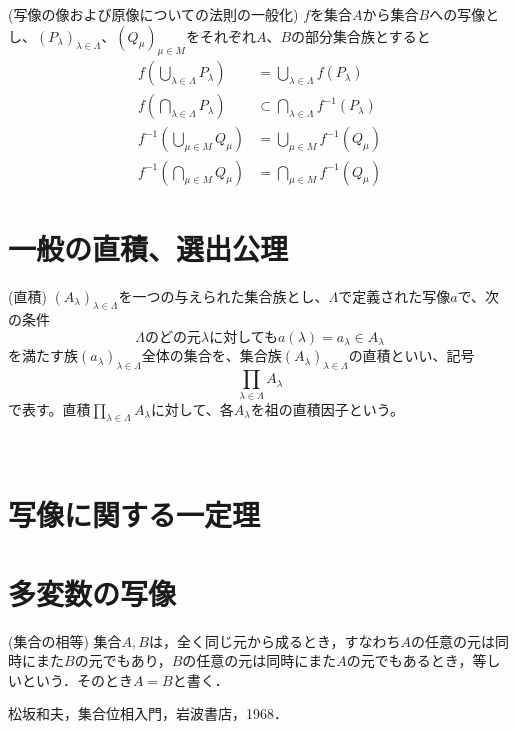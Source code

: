 \documentclass[a4j]{jsarticle}
\begin{document}
\begin{itembox}[l]{ (写像の像および原像についての法則の一般化)}
	$f$を集合$A$から集合$B$への写像とし、$(P_\lambda)_{\lambda \in \Lambda}$、$(Q_\mu)_{\mu \in M}$をそれぞれ$A$、$B$の部分集合族とすると
	\begin{align}
		f \left( \bigcup_{\lambda \in \Lambda}P_\lambda \right) & = \bigcup_{\lambda \in \Lambda}f(P_\lambda)            \\
		f \left( \bigcap_{\lambda \in \Lambda}P_\lambda \right) & \subset \bigcap_{\lambda \in \Lambda}f^{-1}(P_\lambda) \\
		f^{-1} \left( \bigcup_{\mu \in M}Q_\mu \right)          & = \bigcup_{\mu \in M}f^{-1}(Q_\mu)                     \\
		f^{-1} \left( \bigcap_{\mu \in M}Q_\mu \right)          & = \bigcap_{\mu \in M}f^{-1}(Q_\mu)
	\end{align}
\end{itembox}

\section{一般の直積、選出公理}

\begin{itembox}[l]{ (直積)}
	$(A_\lambda)_{\lambda \in \Lambda}$を一つの与えられた集合族とし、$\Lambda$で定義された写像$a$で、次の条件$$ \Lambda\mbox{のどの元}\lambda\mbox{に対しても}a(\lambda)=a_\lambda \in A_\lambda $$を満たす族$(a_\lambda)_{\lambda \in \Lambda}$全体の集合を、集合族$(A_\lambda)_{\lambda \in \Lambda}$の直積といい、記号$$\prod_{\lambda \in \Lambda}A_\lambda$$で表す。直積$\prod_{\lambda \in \Lambda}A_\lambda$に対して、各$A_\lambda$を祖の直積因子という。
\end{itembox}\\



\section{写像に関する一定理}

\section{多変数の写像}

\begin{itembox}[l]{ (集合の相等)}
	集合$A, B$は，全く同じ元から成るとき，すなわち$A$の任意の元は同時にまた$B$の元でもあり，$B$の任意の元は同時にまた$A$の元でもあるとき，等しいという．そのとき$A=B$と書く．
\end{itembox}


\begin{thebibliography}{99}
	松坂和夫，集合位相入門，岩波書店，1968．
\end{thebibliography}
\end{document}
